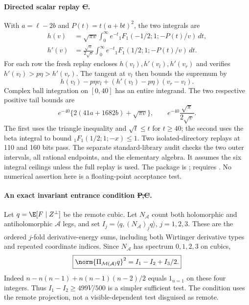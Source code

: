 \paragraph{Directed scalar replay \st{C}.}
With $a=\ell-2b$ and $P(t)=t(a+bt)^2$, the two integrals are
\[
\begin{split}
 h(v)&=\sqrt{\pi v}\int_0^\infty e^{-t}
       {}_1F_1(-1/2;1;-P(t)/v)\,dt,\\
 h'(v)&=\frac{\sqrt\pi}{2\sqrt v}\int_0^\infty e^{-t}
       {}_1F_1(1/2;1;-P(t)/v)\,dt.
\end{split}
\]
For each row the fresh replay encloses $h(v_l),h'(v_l),h'(v_r)$
and verifies $h'(v_l)>p\eta>h'(v_r)$. The tangent at $v_l$ then
bounds the supremum by
\[
 h(v_l)-p\eta v_l+(h'(v_l)-p\eta)(v_r-v_l).
\]
Complex ball integration on $[0,40]$ has an entire integrand.
The two respective positive tail bounds are
\[
 e^{-40}\{2(41a+1682b)+\sqrt{\pi v}\},\qquad
 e^{-40}\frac{\sqrt\pi}{2\sqrt v}.
\]
The first uses the triangle inequality and $\sqrt t\le t$ for
$t\ge40$; the second uses the beta integral to bound
${}_1F_1(1/2;1;-x)\le1$. Two isolated-directory replays at 110 and
160 bits pass. The separate standard-library audit checks the two
outer intervals, all rational endpoints, and the elementary algebra.
It assumes the six integral ceilings unless the full replay is used.
The package is
;
 requires .
No numerical assertion here is a floating-point acceptance test.

\paragraph{An exact invariant entrance condition \st{P,C}.}
Let $q=\E[F\mid Z^\perp]$ be the remote cubic. Let $N_{\mathcal A}$
count both holomorphic and antiholomorphic $\mathcal A$ legs, and set
$I_j=\langle q,(N_{\mathcal A})_{\underline j}q\rangle$, $j=1,2,3$.
These are the ordered $j$-fold derivative-energy sums, including both
Wirtinger derivative types and repeated coordinate indices. Since
$N_{\mathcal A}$ has spectrum $0,1,2,3$ on cubics,
\begin{equation}\label{eq:one-leg-projection}
 \boxed{\norm{\Pi_{\mathcal M(\mathcal A)}q}^2=I_1-I_2+I_3/2.}
\end{equation}
Indeed $n-n(n-1)+n(n-1)(n-2)/2$ equals $1_{n=1}$ on these four
integers. Thus $I_1-I_2\ge499V/500$ is a simpler sufficient test.
The condition uses the remote projection, not a visible-dependent
test disguised as remote.

